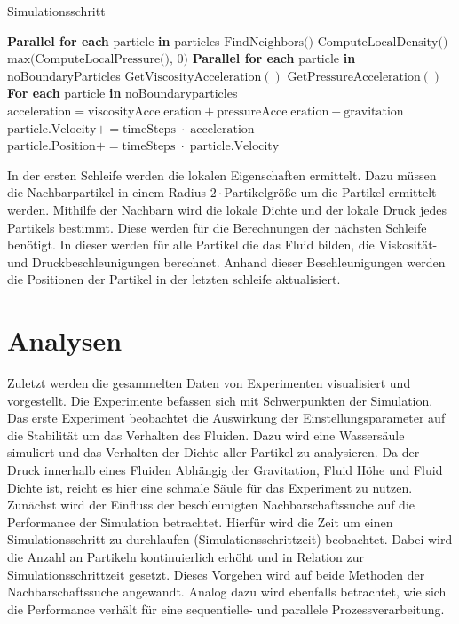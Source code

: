 \documentclass[a4paper, 12pt]{article}
\begin{document}
\begin{algorithm}[H]
	\caption{Simulationsschritt}
	\begin{algorithmic}[1]
	\State \textbf{Parallel for each} particle \textbf{in} particles
	\State \quad $\text{FindNeighbors()}$
	\State \quad $\text{ComputeLocalDensity()}$ \hfill {}
	\State \quad $\text{max(ComputeLocalPressure(), 0)}$ \hfill {}
	\vspace{1em}
	\State \textbf{Parallel for each} particle \textbf{in} noBoundaryParticles
	\State \quad $\text{GetViscosityAcceleration}()$ \hfill {}
	\State \quad $\text{GetPressureAcceleration}()$ \hfill {}
	\vspace{1em}
	\State \textbf{For each} particle \textbf{in} noBoundaryparticles
	\State \quad $\text{acceleration} = \text{viscosityAcceleration} + \text{pressureAcceleration} + \text{gravitation}$
	\State \quad $\text{particle.Velocity} += \text{timeSteps}\;\cdot\;\text{acceleration}$
	\State \quad $\text{particle.Position} += \text{timeSteps}\;\cdot\;\text{particle.Velocity}$
	\end{algorithmic}
	\end{algorithm}

In der ersten Schleife werden die lokalen Eigenschaften ermittelt. Dazu müssen die Nachbarpartikel in einem Radius $2 \cdot \text{Partikelgröße}$ um die Partikel ermittelt werden. Mithilfe der Nachbarn wird die lokale Dichte und der lokale Druck jedes Partikels bestimmt. Diese werden für die Berechnungen der nächsten Schleife benötigt. In dieser werden für alle Partikel die das Fluid bilden, die Viskosität- und Druckbeschleunigungen berechnet. Anhand dieser Beschleunigungen werden die Positionen der Partikel in der letzten schleife aktualisiert. 

\section{Analysen} \label{Kap:Alanysen}
Zuletzt werden die gesammelten Daten von Experimenten visualisiert und vorgestellt. Die Experimente befassen sich mit Schwerpunkten der Simulation. Das erste Experiment beobachtet die Auswirkung der Einstellungsparameter auf die Stabilität um das Verhalten des Fluiden. Dazu wird eine Wassersäule simuliert und das Verhalten der Dichte aller Partikel zu analysieren. Da der Druck innerhalb eines Fluiden Abhängig der Gravitation, Fluid Höhe und Fluid Dichte ist, reicht es hier eine schmale Säule für das Experiment zu nutzen. 
Zunächst wird der Einfluss der beschleunigten Nachbarschaftssuche auf die Performance der Simulation betrachtet. Hierfür wird die Zeit um einen Simulationsschritt zu durchlaufen (Simulationsschrittzeit) beobachtet. Dabei wird die Anzahl an Partikeln kontinuierlich erhöht und in Relation zur Simulationsschrittzeit gesetzt. Dieses Vorgehen wird auf beide Methoden der Nachbarschaftssuche angewandt.
Analog dazu wird ebenfalls betrachtet, wie sich die Performance verhält für eine sequentielle- und parallele Prozessverarbeitung.
\end{document}

